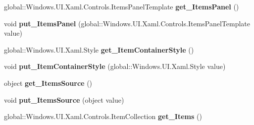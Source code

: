 \begin{DoxyCompactItemize}
\item 
\mbox{\label{interface_windows_1_1_u_i_1_1_xaml_1_1_controls_1_1_i_items_control_ab7176badfe60bbefeb142105c2d8637a}} 
global\+::\+Windows.\+U\+I.\+Xaml.\+Controls.\+Items\+Panel\+Template {\bfseries get\+\_\+\+Items\+Panel} ()
\item 
\mbox{\label{interface_windows_1_1_u_i_1_1_xaml_1_1_controls_1_1_i_items_control_af7be75b1cc3df63d782025e03364f6ea}} 
void {\bfseries put\+\_\+\+Items\+Panel} (global\+::\+Windows.\+U\+I.\+Xaml.\+Controls.\+Items\+Panel\+Template value)
\item 
\mbox{\label{interface_windows_1_1_u_i_1_1_xaml_1_1_controls_1_1_i_items_control_a4459707c1f50a2985881f9d3053ab38f}} 
global\+::\+Windows.\+U\+I.\+Xaml.\+Style {\bfseries get\+\_\+\+Item\+Container\+Style} ()
\item 
\mbox{\label{interface_windows_1_1_u_i_1_1_xaml_1_1_controls_1_1_i_items_control_ac812f5bc0cf3f55197783982db3f878d}} 
void {\bfseries put\+\_\+\+Item\+Container\+Style} (global\+::\+Windows.\+U\+I.\+Xaml.\+Style value)
\item 
\mbox{\label{interface_windows_1_1_u_i_1_1_xaml_1_1_controls_1_1_i_items_control_a7f2312123673103e92e3794fabb7c45a}} 
object {\bfseries get\+\_\+\+Items\+Source} ()
\item 
\mbox{\label{interface_windows_1_1_u_i_1_1_xaml_1_1_controls_1_1_i_items_control_ac735d213748166057ef4cbaae62e336e}} 
void {\bfseries put\+\_\+\+Items\+Source} (object value)
\item 
\mbox{\label{interface_windows_1_1_u_i_1_1_xaml_1_1_controls_1_1_i_items_control_a747bf3c87ce3337134354f5d9b743404}} 
global\+::\+Windows.\+U\+I.\+Xaml.\+Controls.\+Item\+Collection {\bfseries get\+\_\+\+Items} ()
\item 

\end{DoxyCompactItemize}
